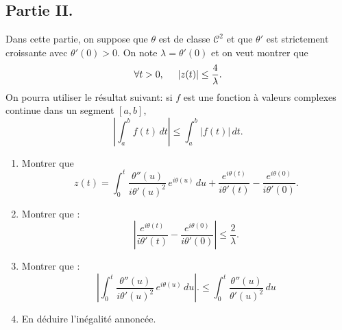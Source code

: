 \subsection*{Partie II.}
Dans cette partie, on suppose que $\theta$ est de classe $\mathcal{C}^2$ et que $\theta'$ est strictement croissante avec $\theta'(0)>0$. On note $\lambda = \theta'(0)$ et on veut montrer que
\begin{displaymath}
  \forall t > 0, \hspace{0.5cm} \left| z(t) \right| \leq \frac{4}{\lambda} .
\end{displaymath}
On pourra utiliser le résultat suivant: si $f$ est une fonction à valeurs complexes continue dans un segment $[a,b]$,
\begin{displaymath}
  \left|\int_a^bf(t)\,dt \right| \leq \int_a^b \left|f(t)\right|\,dt .
\end{displaymath}
\begin{enumerate}
  \item Montrer que 
\begin{displaymath}
  z(t) = \int_0^t\frac{\theta''(u)}{i\theta'(u)^2}\,e^{i\theta(u)}\, du
  +\frac{e^{i\theta(t)}}{i\theta'(t)}-\frac{e^{i\theta(0)}}{i\theta'(0)} .
\end{displaymath}
\item Montrer que :
\begin{displaymath}
  \left|\frac{e^{i\theta(t)}}{i\theta'(t)}-\frac{e^{i\theta(0)}}{i\theta'(0)} \right| \leq \frac{2}{\lambda} .
\end{displaymath}
\item Montrer que :
\begin{displaymath}
  \left| \int_0^t\frac{\theta''(u)}{i\theta'(u)^2}\,e^{i\theta(u)}\, du \right| .
  \leq \int_0^t\frac{\theta''(u)}{\theta'(u)^2}\, du
\end{displaymath}
\item En déduire l'inégalité annoncée.
\end{enumerate}
